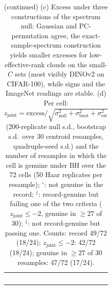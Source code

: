 \begin{table}[H]
\begin{tabular}{lcccccc}
$$\bottomrule
\end{tabular}
\par\vspace{5pt}
\endgroup
\caption{(continued) (c) Excess under three constructions of the spectrum null: Gaussian and PC-permutation agree, the exact-sample-spectrum construction yields smaller excesses for low-effective-rank clouds on the small-$C$ sets (most visibly DINOv2 on CIFAR-100), while signs and the ImageNet readings are stable. (d) Per cell: $z_{\text{joint}} = \text{excess}/\sqrt{\sigma_{\text{null}}^2+\sigma_{\text{boot}}^2+\sigma_{\text{est}}^2}$ (200-replicate null s.d., bootstrap s.d.\ over 30 centroid resamples, quadruple-seed s.d.) and the number of resamples in which the cell is genuine under BH over the 72 cells (50 Haar replicates per resample); $^{\circ}$: not genuine in the record; $^{\dagger}$: record-genuine but failing one of the two criteria ($z_{\text{joint}}\le-2$, genuine in $\ge27$ of 30); $^{\ddagger}$: not record-genuine but passing one. Counts: record 49/72 (18/24); $z_{\text{joint}}\le-2$: 42/72 (18/24); genuine in $\ge27$ of 30 resamples: 47/72 (17/24). %
}
\end{table}
